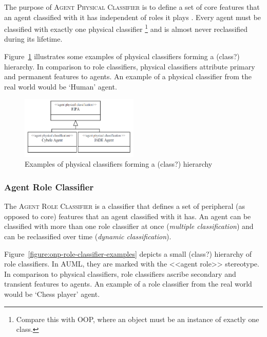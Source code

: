 The purpose of \textsc{Agent Physical Classifier} is to define a set of core features that an agent classified with it has independent of roles it plays \cite{Odell05}.
Every agent must be classified with exactly one physical classifier \footnote{Compare this with OOP, where an object must be an instance of exactly one class.} and is almost never reclassified during its lifetime.

Figure~\ref{figure:onp-physical-classifier-examples} illustrates some examples of physical classifiers forming a (class?) hierarchy.
In comparison to role classifiers, physical classifiers attribute primary and permanent features to agents.
An example of a physical classifier from the real world would be `Human' agent.

\begin{figure}[ht]
	\centering
	\includegraphics[width=0.5\textwidth]{images/onp/physical-classifier-examples.png}
	\caption{Examples of physical classifiers forming a (class?) hierarchy}
	\label{figure:onp-physical-classifier-examples}
\end{figure}

\subsubsection*{Agent Role Classifier}

The \textsc{Agent Role Classifier} is a classifier that defines a set of peripheral (as opposed to core) features that an agent classified with it has.
An agent can be classified with more than one role classifier at once (\textit{multiple classification}) and can be reclassified over time (\textit{dynamic classification}).

Figure~\ref{figure:onp-role-classifier-examples} depicts a small (class?) hierarchy of role classifiers.
In AUML, they are marked with the <<agent role>> stereotype.
In comparison to physical classifiers, role classifiers ascribe secondary and transient features to agents.
An example of a role classifier from the real world would be `Chess player' agent.

